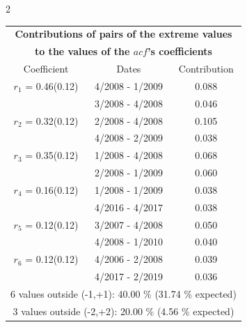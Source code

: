 
\thispagestyle{empty}
\begin{multicols}{2}{ 
\begin{tabular}{ccc}
\multicolumn{3}{c}{\textbf{Contributions of pairs of the extreme values} }  \vspace{-.10in}  \\ 
\multicolumn{3}{c}{ \textbf{to the values of the $acf$'s coefficients}} \\ 
\hline 
\hline                  Coefficient  &  Dates &  Contribution \\ 
\hline 
  $r_{ 1}$ = 0.46(0.12) &       4/2008 -  1/2009 &        0.088   \vspace{-.10in} \\  
&        3/2008 -  4/2008 &        0.046  \vspace{-.02in} \\ \hline 
  $r_{ 2}$ = 0.32(0.12) &       2/2008 -  4/2008 &        0.105   \vspace{-.10in} \\  
&        4/2008 -  2/2009 &        0.038  \vspace{-.02in} \\ \hline 
  $r_{ 3}$ = 0.35(0.12) &       1/2008 -  4/2008 &        0.068   \vspace{-.10in} \\  
&        2/2008 -  1/2009 &        0.060  \vspace{-.02in} \\ \hline 
  $r_{ 4}$ = 0.16(0.12) &       1/2008 -  1/2009 &        0.038   \vspace{-.10in} \\  
&        4/2016 -  4/2017 &        0.038  \vspace{-.02in} \\ \hline 
  $r_{ 5}$ = 0.12(0.12) &       3/2007 -  4/2008 &        0.050   \vspace{-.10in} \\  
&        4/2008 -  1/2010 &        0.040  \vspace{-.02in} \\ \hline 
  $r_{ 6}$ = 0.12(0.12) &       4/2006 -  2/2008 &        0.039   \vspace{-.10in} \\  
&        4/2017 -  2/2019 &        0.036  \vspace{-.02in} \\ \hline 
\multicolumn{3}{c}{               6 values outside (-1,+1): 40.00  \% (31.74  \% expected)}\vspace{-.10in} \\ 
\multicolumn{3}{c}{               3 values outside (-2,+2): 20.00 \%  (4.56 \% expected) } \\
 \end{tabular} \\ 
 } 
\end{multicols} 
